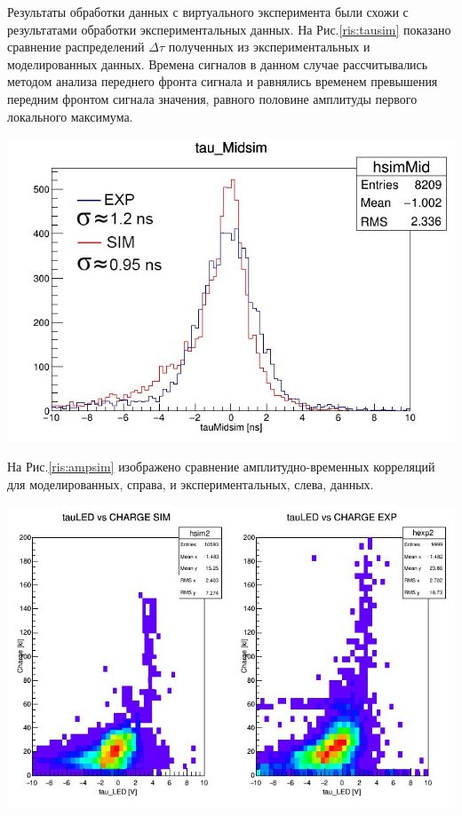 Результаты обработки данных с виртуального эксперимента были схожи с результатами обработки экспериментальных данных. На Рис.\ref{ris:tausim} показано сравнение распределений $\Delta\tau$ полученных из экспериментальных и моделированных данных. Времена сигналов в данном случае рассчитывались методом анализа переднего фронта сигнала и равнялись временем превышения передним фронтом сигнала значения, равного половине амплитуды первого локального максимума.

{
	\centering
	\includegraphics[width=\linewidth]{tausim.png}
	\label{ris:tausim}
}
	
На Рис.\ref{ris:ampsim} изображено сравнение амплитудно-временных корреляций для моделированных, справа, и экспериментальных, слева, данных. 

{
	\centering
	\includegraphics[width=\linewidth]{ampsim.png}
	\label{ris:ampsim}
}

